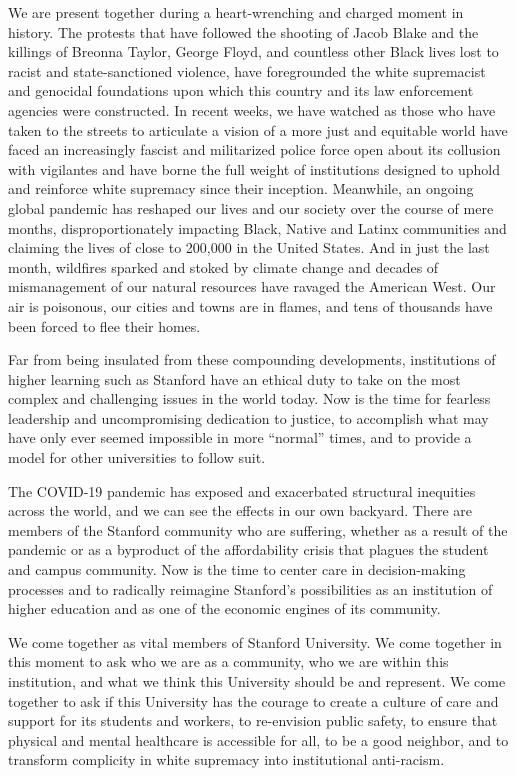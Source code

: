 \documentclass[12pt, titlepage, letterpaper]{article}
\begin{document}
We are present together during a heart-wrenching and charged moment in history. The protests that have followed the shooting of Jacob Blake and the killings of Breonna Taylor, George Floyd, and countless other Black lives lost to racist and state-sanctioned violence, have foregrounded the white supremacist and genocidal foundations upon which this country and its law enforcement agencies were constructed. In recent weeks, we have watched as those who have taken to the streets to articulate a vision of a more just and equitable world have faced an increasingly fascist and militarized police force open about its collusion with vigilantes and have borne the full weight of institutions designed to uphold and reinforce white supremacy since their inception. Meanwhile, an ongoing global pandemic has reshaped our lives and our society over the course of mere months, disproportionately impacting Black, Native and Latinx communities and claiming the lives of close to 200,000 in the United States. And in just the last month, wildfires sparked and stoked by climate change and decades of mismanagement of our natural resources have ravaged the American West. Our air is poisonous, our cities and towns are in flames, and tens of thousands have been forced to flee their homes.

Far from being insulated from these compounding developments, institutions of higher learning such as Stanford have an ethical duty to take on the most complex and challenging issues in the world today. Now is the time for fearless leadership and uncompromising dedication to justice, to accomplish what may have only ever seemed impossible in more ``normal” times, and to provide a model for other universities to follow suit.

The COVID-19 pandemic has exposed and exacerbated structural inequities across the world, and we can see the effects in our own backyard. There are members of the Stanford community who are suffering, whether as a result of the pandemic or as a byproduct of the affordability crisis that plagues the student and campus community. Now is the time to center care in decision-making processes and to radically reimagine Stanford’s possibilities as an institution of higher education and as one of the economic engines of its community. 

We come together as vital members of Stanford University. We come together in this moment to ask who we are as a community, who we are within this institution, and what we think this University should be and represent. We come together to ask if this University has the courage to create a culture of care and support for its students and workers, to re-envision public safety, to ensure that physical and mental healthcare is accessible for all, to be a good neighbor, and to transform complicity in white supremacy into institutional anti-racism. 
\end{document}
